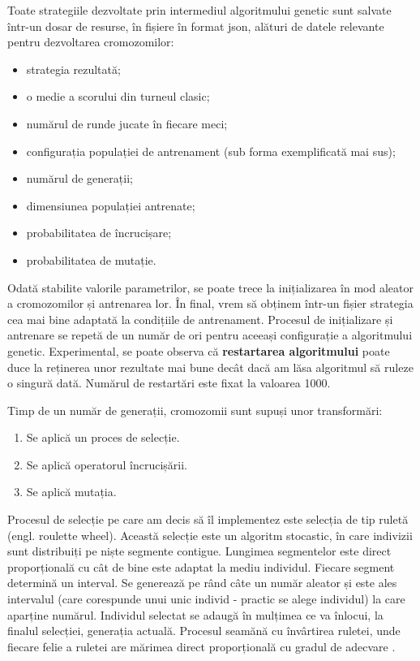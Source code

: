 Toate strategiile dezvoltate prin intermediul algoritmului genetic sunt salvate într-un dosar de resurse, în fișiere în format json, alături de datele relevante pentru dezvoltarea cromozomilor: 
\begin{itemize}
	 \item[\textasteriskcentered] strategia rezultată;
  	 \item[\textasteriskcentered] o medie a scorului din turneul clasic; 
  	 \item[\textasteriskcentered] numărul de runde jucate în fiecare meci;
  	 \item[\textasteriskcentered] configurația populației de antrenament (sub forma exemplificată mai sus);
  	 \item[\textasteriskcentered] numărul de generații; 
  	 \item[\textasteriskcentered] dimensiunea populației antrenate;
  	 \item[\textasteriskcentered] probabilitatea de încrucișare; 
  	 \item[\textasteriskcentered] probabilitatea de mutație. 
\end{itemize} 

Odată stabilite valorile parametrilor, se poate trece la inițializarea în mod aleator a cromozomilor și antrenarea lor. În final, vrem să obținem într-un fișier strategia cea mai bine adaptată la condițiile de antrenament. Procesul de inițializare și antrenare se repetă de un număr de ori pentru aceeași configurație a algoritmului genetic. Experimental, se poate observa că \textbf{restartarea algoritmului} poate duce la reținerea unor rezultate mai bune decât dacă am lăsa algoritmul să ruleze o singură dată. Numărul de restartări este fixat la valoarea 1000.

\clearpage

Timp de un număr de generații, cromozomii sunt supuși unor transformări: 
\begin{enumerate} 
	\item Se aplică un proces de selecție.
	\item Se aplică operatorul încrucișării.
	\item Se aplică mutația.
\end{enumerate} 

Procesul de selecție pe care am decis să îl implementez este selecția de tip ruletă (engl. roulette wheel). Această selecție este un algoritm stocastic, în care indivizii sunt distribuiți pe niște segmente contigue. Lungimea segmentelor este direct proporțională cu cât de bine este adaptat la mediu individul. Fiecare segment determină un interval. Se generează pe rând câte un număr aleator și este ales intervalul (care corespunde unui unic individ - practic se alege individul) la care aparține numărul. Individul selectat se adaugă în mulțimea ce va înlocui, la finalul selecției, generația actuală. Procesul seamănă cu învârtirea ruletei, unde fiecare felie a ruletei are mărimea direct proporțională cu gradul de adecvare \cite{curs_prof_gabriel_oltean_cluj}.  

